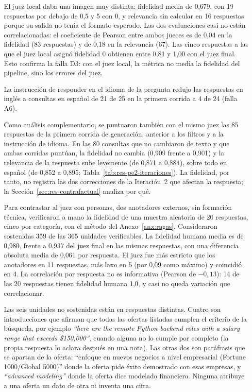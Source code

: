 El juez local daba una imagen muy distinta: fidelidad media de 0,679, con 19 respuestas por debajo de 0,5 y 5 con 0, y relevancia sin calcular en 16 respuestas porque su salida no tenía el formato esperado. Las dos evaluaciones casi no están correlacionadas: el coeficiente de Pearson entre ambos jueces es de 0,04 en la fidelidad (83 respuestas) y de 0,18 en la relevancia (67). Las cinco respuestas a las que el juez local asignó fidelidad 0 obtienen entre 0,81 y 1,00 con el juez final. Esto confirma la falla D3: con el juez local, la métrica no medía la fidelidad del pipeline, sino los errores del juez.

La instrucción de responder en el idioma de la pregunta redujo las respuestas en inglés a consultas en español de 21 de 25 en la primera corrida a 4 de 24 (falla A6).

Como análisis complementario, se puntuaron también con el mismo juez las 85 respuestas de la primera corrida de generación, anterior a los filtros y a la instrucción de idioma. En las 80 consultas que no cambiaron de texto y que ambas corridas puntúan, la fidelidad no cambia (0,909 frente a 0,901) y la relevancia de la respuesta sube levemente (de 0,871 a 0,884), sobre todo en español (de 0,852 a 0,895; Tabla~\ref{tab:res-pe2-iteraciones}). La fidelidad, por tanto, no registra las dos correcciones de la Iteración~2 que afectan la respuesta; la Sección~\ref{sec:res-contrafactual} analiza por qué.



Para contrastar al juez con personas, dos anotadores externos, sin formación técnica, verificaron a mano la fidelidad de una muestra aleatoria de 20 respuestas, cinco por categoría, con el método del Anexo~\ref{anx:ragas}. Consideraron sostenidas 359 de las 365 unidades verificables. La fidelidad humana media es de 0,980, frente a 0,937 del juez final en las mismas respuestas, con una diferencia absoluta media de 0,061 por respuesta. El juez fue más estricto que los anotadores en 11 respuestas, más laxo en 5 (por 0,09 como máximo) y coincidió en 4. La correlación por respuesta no es informativa (Pearson de $-0{,}13$): 14 de las 20 respuestas tienen fidelidad humana 1,0, y casi no queda variación que correlacionar.

Las seis unidades no sostenidas están en respuestas distintas. Cuatro son introducciones que afirman que todas las ofertas listadas cumplen el criterio de la búsqueda, por ejemplo \textit{\enquote{here are the remote Python backend roles with a salary range that exceeds \$150,000}}, cuando alguna no lo cumple por completo (la propia respuesta lo aclara después en una nota). Las otras dos son paráfrasis que se apartan de la oferta: \enquote{enfoque en nuevos negocios a nivel empresarial (Fortune 1000/Global 5000)} donde la oferta pide éxito demostrado con esas empresas, y \textit{\enquote{advanced modeling}} donde la oferta dice modelado financiero. Ninguna atribuye a una oferta un dato de otra ni inventa una cifra.

